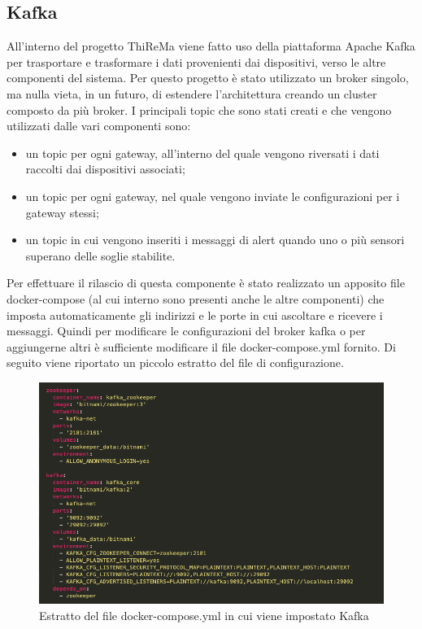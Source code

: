 \subsection{Kafka}
	All'interno del progetto ThiReMa viene fatto uso della piattaforma Apache Kafka per trasportare e trasformare i dati provenienti dai dispositivi, verso le altre componenti del sistema.
	\newline
	Per questo progetto è stato utilizzato un broker singolo, ma nulla vieta, in un futuro, di estendere l'architettura creando un cluster composto da più broker.
	\newline
	\newline
	I principali topic che sono stati creati e che vengono utilizzati dalle vari componenti sono:
	\begin{itemize}
		\item un topic per ogni gateway, all'interno del quale vengono riversati i dati raccolti dai dispositivi associati;
		\item un topic per ogni gateway, nel quale vengono inviate le configurazioni per i gateway stessi;
		\item un topic in cui vengono inseriti i messaggi di alert quando uno o più sensori superano delle 
		soglie stabilite.
	\end{itemize}
	Per effettuare il rilascio di questa componente è stato realizzato un apposito file docker-compose (al cui interno sono presenti anche le altre componenti) che imposta automaticamente gli indirizzi e le porte in cui ascoltare e ricevere i messaggi. Quindi per modificare le configurazioni del broker kafka o per aggiungerne altri è sufficiente modificare il file docker-compose.yml fornito.
	\newline
	Di seguito viene riportato un piccolo estratto del file di configurazione.

		\begin{figure}[H]
			\centering
			\includegraphics[scale=0.470]{res/images/estrattoKafka_dockerCompose.png}
			\caption{Estratto del file docker-compose.yml in cui viene impostato Kafka}
			\label{Immagine 1}
		\end{figure}
	\pagebreak

